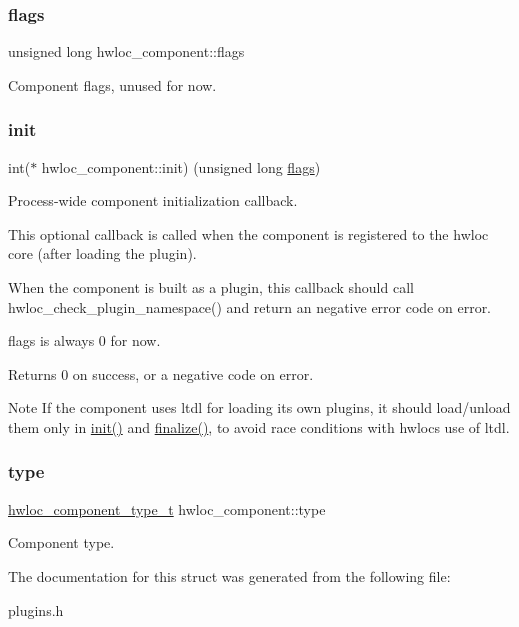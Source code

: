 \subsubsection{\texorpdfstring{flags}{flags}}
{\footnotesize\ttfamily unsigned long hwloc\+\_\+component\+::flags}



Component flags, unused for now. 

\mbox{\label{a00378_aea613546886d9b8221cadba920fe3ebc}} 
\subsubsection{\texorpdfstring{init}{init}}
{\footnotesize\ttfamily int($\ast$ hwloc\+\_\+component\+::init) (unsigned long \hyperlink{a00378_ab8043c5b4cc0e81aabba586ccb194335}{flags})}



Process-\/wide component initialization callback. 

This optional callback is called when the component is registered to the hwloc core (after loading the plugin).

When the component is built as a plugin, this callback should call hwloc\+\_\+check\+\_\+plugin\+\_\+namespace() and return an negative error code on error.

{\ttfamily flags} is always 0 for now.

\begin{DoxyReturn}{Returns}
0 on success, or a negative code on error.
\end{DoxyReturn}
\begin{DoxyNote}{Note}
If the component uses ltdl for loading its own plugins, it should load/unload them only in \hyperlink{a00378_aea613546886d9b8221cadba920fe3ebc}{init()} and \hyperlink{a00378_a4612015451a1c706e8ba19114cb8baae}{finalize()}, to avoid race conditions with hwloc\textquotesingle{}s use of ltdl. 
\end{DoxyNote}
\mbox{\label{a00378_a789208ada7e17492cfd3a5a88a6bb0ee}} 
\subsubsection{\texorpdfstring{type}{type}}
{\footnotesize\ttfamily \hyperlink{a00229_ga0aebfa65317af10bb18d7d35f6dc05b8}{hwloc\+\_\+component\+\_\+type\+\_\+t} hwloc\+\_\+component\+::type}



Component type. 



The documentation for this struct was generated from the following file\+:\begin{DoxyCompactItemize}
\item 
plugins.\+h\end{DoxyCompactItemize}
